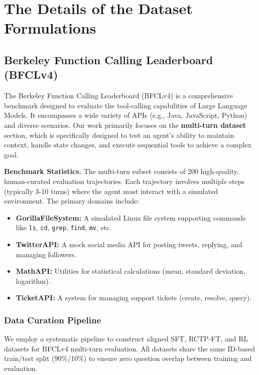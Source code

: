 \documentclass{article}
\theoremstyle{plain}
\theoremstyle{definition}
\theoremstyle{remark}
\begin{document}
\section{The Details of the Dataset Formulations}
\label{app:dataset}

\subsection{Berkeley Function Calling Leaderboard (BFCLv4)}
The Berkeley Function Calling Leaderboard (BFCLv4) \cite{bfcl2024} is a comprehensive benchmark designed to evaluate the tool-calling capabilities of Large Language Models. It encompasses a wide variety of APIs (e.g., Java, JavaScript, Python) and diverse scenarios. Our work primarily focuses on the \textbf{multi-turn dataset} section, which is specifically designed to test an agent's ability to maintain context, handle state changes, and execute sequential tools to achieve a complex goal.

\textbf{Benchmark Statistics.}
The multi-turn subset consists of 200 high-quality, human-curated evaluation trajectories. Each trajectory involves multiple steps (typically 3-10 turns) where the agent must interact with a simulated environment. The primary domains include:
\begin{itemize}
    \item \textbf{GorillaFileSystem:} A simulated Linux file system supporting commands like \texttt{ls}, \texttt{cd}, \texttt{grep}, \texttt{find}, \texttt{mv}, etc.
    \item \textbf{TwitterAPI:} A mock social media API for posting tweets, replying, and managing followers.
    \item \textbf{MathAPI:} Utilities for statistical calculations (mean, standard deviation, logarithm).
    \item \textbf{TicketAPI:} A system for managing support tickets (create, resolve, query).
\end{itemize}

\subsubsection{Data Curation Pipeline}
\label{app:bfcl_curation}

We employ a systematic pipeline to construct aligned SFT, RCTP-FT, and RL datasets for BFCLv4 multi-turn evaluation. All datasets share the same ID-based train/test split (90\%/10\%) to ensure zero question overlap between training and evaluation.
\end{document}
